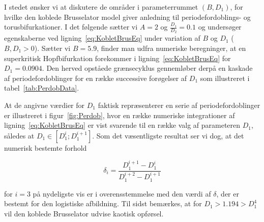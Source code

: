 \vspace{4.0mm}
I stedet {\o}nsker vi at diskutere de omr{\aa}der i
parameterrummet $(B,D_1)$, for hvilke den koblede
Brusselator model giver anledning til periodefordoblings-
og torusbifurkationer. I det f{\o}lgende s{\ae}tter vi
$A=2$ og $\frac{D_1}{D_2}=0.1$ og unders{\o}ger
egenskaberne ved lig\-ning~\ref{eq:KobletBrusEq} under
variation af $B$ og $D_1$ ($B,D_1 > 0$). S{\ae}tter vi
$B=5.9$, finder man udfra numeriske beregninger, at en
superkritisk Hopfbifurkation forekommer i
lig\-ning~\ref{eq:KobletBrusEq} for $D_1=0.0904$. Den
herved opst{\aa}ede gr{\ae}nsecyklus genneml{\o}ber
derp{\aa} en kaskade af periodefordoblinger for en
r{\ae}kke successive for{\o}gelser af $D_1$ som illustreret
i tabel~\ref{tab:PerdobData}.

\vspace{4.0mm}
At de angivne v{\ae}rdier for $D_1$ faktisk
repr{\ae}senterer en serie af periodefordoblinger er
illustreret i figur~\ref{fig:Perdob}, hvor en r{\ae}kke
numeriske integrationer af lig\-ning~\ref{eq:KobletBrusEq}
er vist svarende til en r{\ae}kke valg af parameteren
$D_1$, s{\aa}ledes at $D_1 \in [D_1^{i};D_1^{i+1}]$. Som
det v{\ae}sentligste resultat ser vi dog, at det numerisk
bestemte forhold

\begin{equation}
 \delta_i = \frac{D_1^{i+1}-D_1^{i}}{D_1^{i+2}-D_1^{i+1}}
\end{equation}

for $i=3$ p{\aa} nydeligste vis er i overensstemmelse med
den v{\ae}rdi af $\delta$, der er bestemt for den
logistiske afbildning. Til sidst bem{\ae}rkes, at for
$D_1>1.194>D_1^4$ vil den koblede Brusselator udvise
kaotisk opf{\o}rsel.

